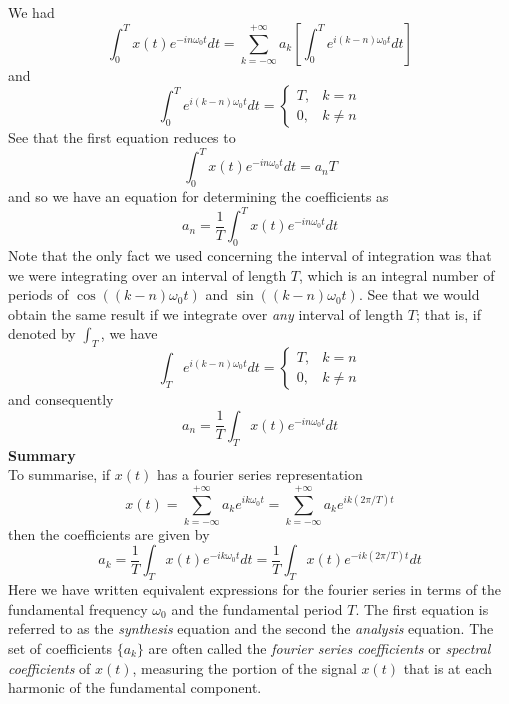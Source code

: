 \documentclass{report}
\begin{document}
We had
\begin{equation*}
\int^T_0x(t)e^{-in\omega_0t}dt=\sum^{+\infty}_{k=-\infty}a_k\left[\int^T_0e^{i(k-n)\omega_0t}dt\right]
\end{equation*}
and 
\begin{equation*}
\int^T_0e^{i(k-n)\omega_0t}dt=\begin{cases}
T,&k=n\\
0,&k\neq n\end{cases}
\end{equation*}
See that the first equation reduces to
\begin{equation*}
\int^T_0x(t)e^{-in\omega_0t}dt=a_nT
\end{equation*}
and so we have an equation for determining the coefficients as
\begin{equation*}
a_n=\frac{1}{T}\int^T_0x(t)e^{-in\omega_0t}dt
\end{equation*}
Note that the only fact we used concerning the interval of integration was that we were integrating over an interval of length $T$, which is an integral number of periods of $\cos((k-n)\omega_0t)$ and
$\sin((k-n)\omega_0t)$. See that we would obtain the same result if we integrate over \textit{any} interval of length $T$; that is, if denoted by $\int_T$, we have
\begin{equation*}
\int_Te^{i(k-n)\omega_0t}dt=\begin{cases}
T,&k=n\\
0,&k\neq n\end{cases}
\end{equation*}
and consequently
\begin{equation*}
a_n=\frac{1}{T}\int_Tx(t)e^{-in\omega_0t}dt
\end{equation*}
\textbf{Summary}\\
To summarise, if $x(t)$ has a fourier series representation
\begin{equation*}
x(t)=\sum^{+\infty}_{k=-\infty}a_ke^{ik\omega_0t}=\sum^{+\infty}_{k=-\infty}a_ke^{ik(2\pi/T)t}
\end{equation*}
then the coefficients are given by
\begin{equation*}
a_k=\frac{1}{T}\int_Tx(t)e^{-ik\omega_0t}dt=\frac{1}{T}\int_Tx(t)e^{-ik(2\pi/T)t}dt
\end{equation*}
Here we have written equivalent expressions for the fourier series in terms of the fundamental frequency $\omega_0$ and the fundamental period $T$. The first equation is referred to as the 
\textit{synthesis} equation and the second the \textit{analysis} equation. The set of coefficients
$\{a_k\}$ are often called the \textit{fourier series coefficients} or \textit{spectral coefficients} of $x(t)$, measuring the portion of the signal $x(t)$ that is at each harmonic of the fundamental
component.
\newpage
\end{document}
